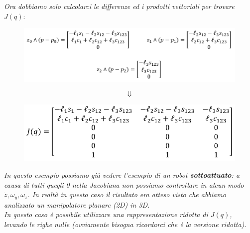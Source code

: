 \vspace*{10pt}
\textit{Ora dobbiamo solo calcolarci le differenze ed i prodotti vettoriali per trovare} $J(q)$:
\begin{figure}[H]
	\centering
	\includegraphics[width=0.8\linewidth]{images/diff_kine_4}
	\label{fig:diffkine4}
\end{figure}
\vspace*{-30pt}
$$
\Downarrow
$$
\begin{figure}[H]
	\centering
	\includegraphics[width=0.6\linewidth]{images/diff_kine_5}
	\label{fig:diffkine5}
\end{figure}

\textit{In questo esempio possiamo già vedere l'esempio di un robot \textbf{sottoattuato}: a causa di tutti quegli 0 nella Jacobiana non possiamo controllare in alcun modo $\dot{z}, \omega_y, \omega_z$. In realtà in questo caso il risultato era atteso visto che abbiamo analizzato un manipolatore planare (2D) in 3D.\\ In questo caso è possibile utilizzare una rappresentazione ridotta di $J(q)$, levando le righe nulle (ovviamente bisogna ricordarci che è la versione ridotta)}.





